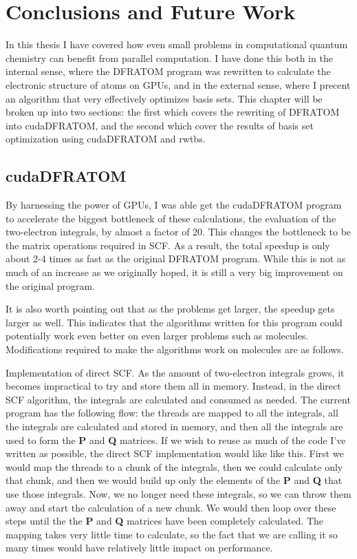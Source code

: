 \chapter{Conclusions and Future Work}

In this thesis I have covered how even small problems in computational quantum chemistry can benefit from parallel computation. I have done this both in the internal sense, where the DFRATOM program was rewritten to calculate the electronic structure of atoms on GPUs, and in the external sense, where I precent an algorithm that very effectively optimizes basis sets. This chapter will be broken up into two sections: the first which covers the rewriting of DFRATOM into cudaDFRATOM, and the second which cover the results of basis set optimization using cudaDFRATOM and rwtbs.

\section{cudaDFRATOM}
By harnessing the power of GPUs, I was able get the cudaDFRATOM program to accelerate the biggest bottleneck of these calculations, the evaluation of the two-electron integrals, by almost a factor of 20. This changes the bottleneck to be the matrix operations required in SCF. As a result, the total speedup is only about 2-4 times as fast as the original DFRATOM program. While this is not as much of an increase as we originally hoped, it is still a very big improvement on the original program.

It is also worth pointing out that as the problems get larger, the speedup gets larger as well. This indicates that the algorithms written for this program could potentially work even better on even larger problems such as molecules. Modifications required to make the algorithms work on molecules are as follows. 

Implementation of direct SCF. As the amount of two-electron integrals grows, it becomes impractical to try and store them all in memory. Instead, in the direct SCF algorithm, the integrals are calculated and consumed as needed. The current program has the following flow: the threads are mapped to all the integrals, all the integrals are calculated and stored in memory, and then all the integrals are used to form the \textbf{P} and \textbf{Q} matrices. If we wish to reuse as much of the code I've written as possible, the direct SCF implementation would like like this. First we would map the threads to a chunk of the integrals, then we could calculate only that chunk, and then we would build up only the elements of the \textbf{P} and \textbf{Q} that use those integrals. Now, we no longer need these integrals, so we can throw them away and start the calculation of a new chunk. We would then loop over these steps until the the \textbf{P} and \textbf{Q} matrices have been completely calculated. The mapping takes very little time to calculate, so the fact that we are calling it so many times would have relatively little impact on performance. 

